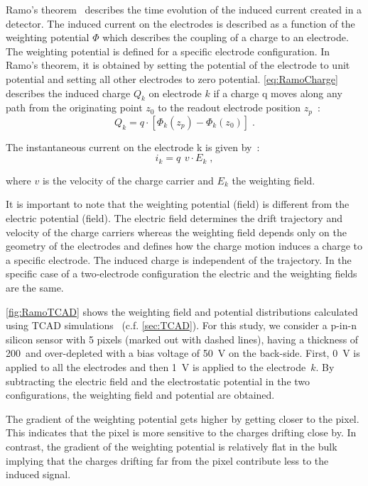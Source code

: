 Ramo's theorem~\cite{Ramo:1939vr} describes the time evolution of the
induced current created in a detector. The induced current on the
electrodes is described as a function of the weighting potential
$\Phi$ which describes the coupling of a charge to an electrode. The
weighting potential is defined for a specific electrode
configuration. In Ramo's theorem, it is obtained by setting the
potential of the electrode to unit potential and setting all other
electrodes to zero potential. \cref{eq:RamoCharge} describes the
induced charge $Q_k$ on electrode $k$ if a charge q moves along any
path from the originating point $z_0$ to the readout electrode
position $z_p$~\cite{Spieler2005}:
\begin{equation}
    Q_{k}=q \cdot [\Phi_k(z_p)-\Phi_k(z_0)] \; .
   \label{eq:RamoCharge} 
  \end{equation}

The instantaneous current on the electrode k is given by~\cite{Spieler2005}: 
\begin{equation}
    i_{k}=q \,\ v \cdot E_k \; ,
   \label{eq:RamoCurrent} 
  \end{equation}

  where $v$ is the velocity of the charge carrier and $E_k$ the
  weighting field.

  It is important to note that the weighting potential (field) is
  different from the electric potential (field). The electric field
  determines the drift trajectory and velocity of the charge carriers
  whereas the weighting field depends only on the geometry of the
  electrodes and defines how the charge motion induces a charge to a
  specific electrode. The induced charge is independent of the
  trajectory. In the specific case of a two-electrode configuration
  the electric and the weighting fields are the same.


  \cref{fig:RamoTCAD} shows the weighting field and potential
  distributions calculated using TCAD simulations~\cite{synopsysTCAD}
  (c.f. \cref{sec:TCAD}). For this study, we consider a p-in-n silicon
  sensor with 5 pixels (marked out with dashed lines), having a
  thickness of 200~\micron and over-depleted with a bias voltage of
  \SI{50}{\volt} on the back-side. First, \SI{0}{\volt} is applied to
  all the electrodes and then \SI{1}{\volt} is applied to the
  electrode~$k$. By subtracting the electric field and the
  electrostatic potential in the two configurations, the weighting
  field and potential are obtained.

  The gradient of the weighting potential gets higher by getting
  closer to the pixel. This indicates that the pixel is more sensitive
  to the charges drifting close by. In contrast, the gradient of the
  weighting potential is relatively flat in the bulk implying that the
  charges drifting far from the pixel contribute less to the induced
  signal.


